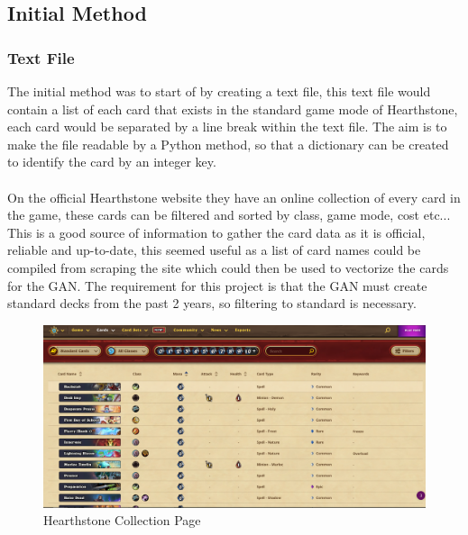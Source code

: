 \documentclass{report} %
\begin{document}
\subsection{Initial Method}
\subsubsection{Text File}
The initial method was to start of by creating a text file, this text file would contain a list of each card that exists in the standard game mode of Hearthstone, each card would be separated by a line break within the text file. The aim is to make the file readable by a Python method, so that a dictionary can be created to identify the card by an integer key. \\
\\
\indent On the official Hearthstone website they have an online collection of every card in the game, these cards can be filtered and sorted by class, game mode, cost etc... This is a good source of information to gather the card data as it is official, reliable and up-to-date, this seemed useful as a list of card names could be compiled from scraping the site which could then be used to vectorize the cards for the GAN. The requirement for this project is that the GAN must create standard decks from the past 2 years, so filtering to standard is necessary. \\

\begin{figure}[h]
\centering
\includegraphics[width=1\textwidth]{collectionpage}
\caption{Hearthstone Collection Page\protect\footnotemark}
\label{board}
\end{figure}
\end{document}
